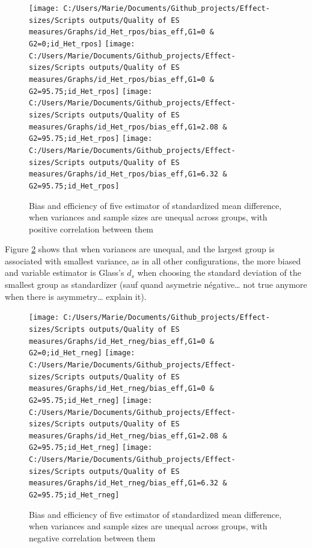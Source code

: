 \documentclass[
  man,floatsintext]{apa6}
\begin{document}
\begin{figure}

{\centering \texttt{[image: C:/Users/Marie/Documents/Github\_projects/Effect-sizes/Scripts outputs/Quality of ES measures/Graphs/id\_Het\_rpos/bias\_eff,G1=0 \& G2=0;id\_Het\_rpos]} \texttt{[image: C:/Users/Marie/Documents/Github\_projects/Effect-sizes/Scripts outputs/Quality of ES measures/Graphs/id\_Het\_rpos/bias\_eff,G1=0 \& G2=95.75;id\_Het\_rpos]} \texttt{[image: C:/Users/Marie/Documents/Github\_projects/Effect-sizes/Scripts outputs/Quality of ES measures/Graphs/id\_Het\_rpos/bias\_eff,G1=2.08 \& G2=95.75;id\_Het\_rpos]} \texttt{[image: C:/Users/Marie/Documents/Github\_projects/Effect-sizes/Scripts outputs/Quality of ES measures/Graphs/id\_Het\_rpos/bias\_eff,G1=6.32 \& G2=95.75;id\_Het\_rpos]} 

}

\caption{Bias and efficiency of five estimator of standardized mean difference, when variances and sample sizes are unequal across groups, with positive correlation between them}\label{fig:idHetrpos}
\end{figure}

Figure \ref{fig:idHetrneg} shows that when variances are unequal, and the largest group is associated with smallest variance, as in all other configurations, the more biased and variable estimator is Glass's \(d_s\) when choosing the standard deviation of the smallest group as standardizer (sauf quand asymetrie négative\ldots{} not true anymore when there is asymmetry\ldots{} explain it).

\begin{figure}

{\centering \texttt{[image: C:/Users/Marie/Documents/Github\_projects/Effect-sizes/Scripts outputs/Quality of ES measures/Graphs/id\_Het\_rneg/bias\_eff,G1=0 \& G2=0;id\_Het\_rneg]} \texttt{[image: C:/Users/Marie/Documents/Github\_projects/Effect-sizes/Scripts outputs/Quality of ES measures/Graphs/id\_Het\_rneg/bias\_eff,G1=0 \& G2=95.75;id\_Het\_rneg]} \texttt{[image: C:/Users/Marie/Documents/Github\_projects/Effect-sizes/Scripts outputs/Quality of ES measures/Graphs/id\_Het\_rneg/bias\_eff,G1=2.08 \& G2=95.75;id\_Het\_rneg]} \texttt{[image: C:/Users/Marie/Documents/Github\_projects/Effect-sizes/Scripts outputs/Quality of ES measures/Graphs/id\_Het\_rneg/bias\_eff,G1=6.32 \& G2=95.75;id\_Het\_rneg]} 

}

\caption{Bias and efficiency of five estimator of standardized mean difference, when variances and sample sizes are unequal across groups, with negative correlation between them}\label{fig:idHetrneg}
\end{figure}
\end{document}
